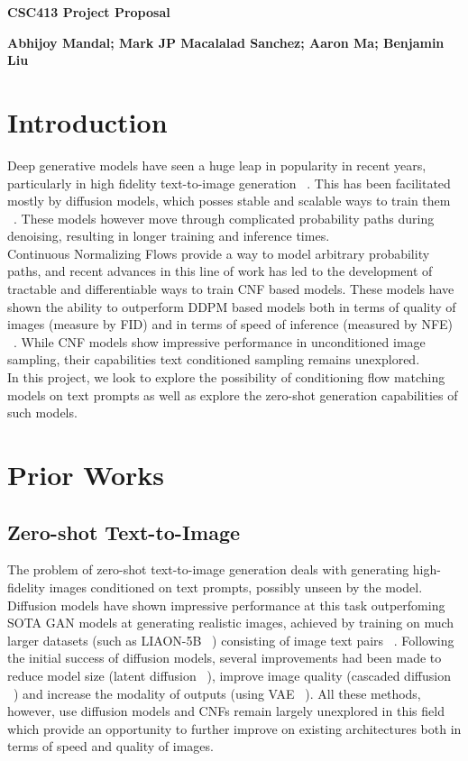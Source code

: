 \documentclass[12pt]{article}
\begin{document}
\color{black}
\begin{center}\textbf{\large CSC413 Project Proposal}\\\bigskip

 {\bf Abhijoy Mandal; Mark JP Macalalad Sanchez; Aaron Ma; Benjamin Liu
  }
\end{center}

\noindent

\section{Introduction}

Deep generative models have seen a huge leap in popularity in recent years, particularly in high fidelity text-to-image generation ~\cite{ramesh2021zeroshot}. This has been facilitated mostly by diffusion models, which posses stable and scalable ways to train them ~\cite{NEURIPS2020_4c5bcfec}. These models however move through complicated probability paths during denoising, resulting in longer training and inference times. ~\cite{lipman2023flow}
\\
Continuous Normalizing Flows provide a way to model arbitrary probability paths, and recent advances in this line of work has led to the development of tractable and differentiable ways to train CNF based models. These models have shown the ability to outperform DDPM based models both in terms of quality of images (measure by FID) and in terms of speed of inference (measured by NFE) ~\cite{lipman2023flow}. While CNF models show impressive performance in unconditioned image sampling, their capabilities text conditioned sampling remains unexplored.
\\
In this project, we look to explore the possibility of conditioning flow matching models on text prompts as well as explore the zero-shot generation capabilities of such models.

\section{Prior Works}
\subsection{Zero-shot Text-to-Image}
The problem of zero-shot text-to-image generation deals with generating high-fidelity images conditioned on text prompts, possibly unseen by the model. Diffusion models have shown impressive performance at this task outperfoming SOTA GAN models at generating realistic images, achieved by training on much larger datasets (such as LIAON-5B ~\cite{schuhmann2022laion}) consisting of image text pairs ~\cite{ramesh2021zeroshot, saharia2022photorealistic}. Following the initial success of diffusion models, several improvements had been made to reduce model size (latent diffusion ~\cite{rombach2022high}), improve image quality (cascaded diffusion ~\cite{ho2022cascaded}) and increase the modality of outputs (using VAE ~\cite{ramesh2021zeroshot}). All these methods, however, use diffusion models and CNFs remain largely unexplored in this field which provide an opportunity to further improve on existing architectures both in terms of speed and quality of images.
\end{document}
